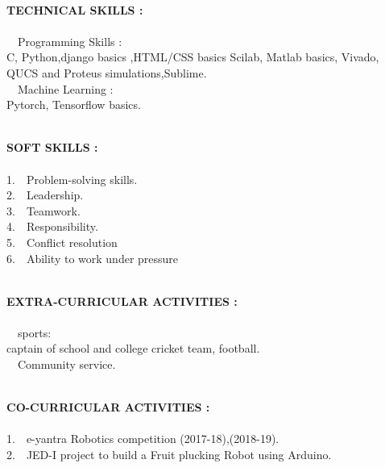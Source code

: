 \documentclass[1pt]{article}
\begin{document}
\begin{flushleft}
			\hspace{1cm}\\ \hspace{1cm}
			
		{\small \textbf{TECHNICAL SKILLS :}}\\ \ \\
			\textbullet \ \  Programming Skills :  \\ \hspace{1.4cm}C, Python,django basics ,HTML/CSS basics Scilab, Matlab basics, Vivado, QUCS and Proteus simulations,Sublime.\\
			
			\textbullet \ \ Machine Learning :  \\ \hspace{1.4cm}Pytorch, Tensorflow basics.\\
			
			
			\hspace{1cm}\\ \hspace{1cm}
			
			
			{\small \textbf{SOFT SKILLS :}}\\ \ \\
			1.\ \ Problem-solving skills.\\
			2.\ \  Leadership.\\	
			3.\ \ Teamwork.\\
			4.\ \ Responsibility.\\
			5.\ \ Conflict resolution\\
			6.\ \ Ability to work under pressure\\
			
			 
				\hspace{1cm}\\ \hspace{1cm}
			
				
			{\small \textbf{EXTRA-CURRICULAR ACTIVITIES :}}\\ \ \\
			\textbullet \ \ sports:\\ \hspace{1cm}captain of school and college cricket team, football.\\
			\textbullet \ \ Community service.\\
			
			
			\hspace{1cm}\\ \hspace{1cm}
			
			
			{\small \textbf{CO-CURRICULAR ACTIVITIES :}}\\ \ \\
			1.\ \ e-yantra Robotics competition (2017-18),(2018-19).\\	
			2.\ \ JED-I project to build a Fruit plucking Robot using Arduino.\\
				

\end{flushleft}
\end{document}
